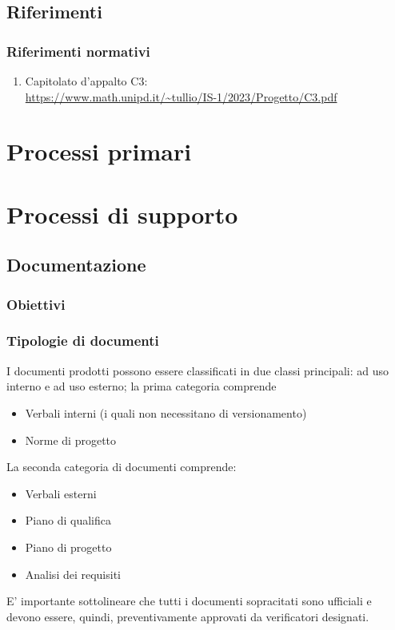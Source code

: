\documentclass[12pt, oneside]{article}
\begin{document}
\subsection{Riferimenti}
\subsubsection{Riferimenti normativi}
\begin{enumerate}
    \item Capitolato d'appalto C3: \\ \url{https://www.math.unipd.it/~tullio/IS-1/2023/Progetto/C3.pdf}
\end{enumerate}
\newpage

\section{Processi primari}
\newpage

\section{Processi di supporto}
\subsection{Documentazione}
\subsubsection{Obiettivi}
\subsubsection{Tipologie di documenti}
I documenti prodotti possono essere classificati in due classi principali: ad uso interno e ad uso esterno; la prima categoria comprende
\begin{itemize}
    \item Verbali interni (i quali non necessitano di versionamento)
    \item Norme di progetto
\end{itemize}
La seconda categoria di documenti comprende:
\begin{itemize}
    \item Verbali esterni
    \item Piano di qualifica
    \item Piano di progetto
    \item Analisi dei requisiti
\end{itemize}
E' importante sottolineare che tutti i documenti sopracitati sono ufficiali e devono essere, quindi, preventivamente approvati da verificatori designati.
\end{document}
